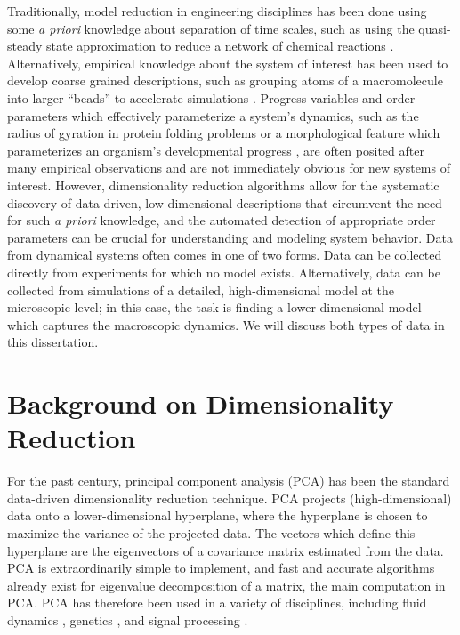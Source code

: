 Traditionally, model reduction in engineering disciplines has been done using some {\em a priori} knowledge about separation of time scales,
such as using the quasi-steady state approximation to reduce a network of chemical reactions \cite{bowen1963singular}.
%
Alternatively, empirical knowledge about the system of interest has been used to develop coarse grained descriptions, such as grouping atoms of a macromolecule into larger ``beads'' to accelerate simulations \cite{izvekov2005systematic, monticelli2008martini, saunders2013coarse, spiga2013electrostatic}.
%
Progress variables and order parameters which effectively parameterize a system's dynamics, such as the radius of gyration in protein folding problems \cite{lazaridis1997new, kim2015systematic} or a  morphological feature which parameterizes an organism's developmental progress \cite{dubuis2013accurate, hamaratoglu2011dpp}, are often posited after many empirical observations and are not immediately obvious for new systems of interest.
%
However, dimensionality reduction algorithms allow for the systematic discovery of data-driven, low-dimensional descriptions that circumvent the need for such {\em a priori} knowledge, and the automated detection of appropriate order parameters can be crucial for understanding and modeling system behavior.
%
%
Data from dynamical systems often comes in one of two forms.
%
Data can be collected directly from experiments for which no model exists.
%
Alternatively, data can be collected from simulations of a detailed, high-dimensional model at the microscopic level; in this case, the task is finding a lower-dimensional model which captures the macroscopic dynamics.
%
We will discuss both types of data in this dissertation.

\section{Background on Dimensionality Reduction} \label{sec:background}


For the past century, principal component analysis (PCA) \cite{shlens2005tutorial} has been the standard data-driven dimensionality reduction technique.
%
PCA projects (high-dimensional) data onto a lower-dimensional hyperplane, where the hyperplane is chosen to maximize the variance of the projected data.
%
The vectors which define this hyperplane are the eigenvectors of a covariance matrix estimated from the data.
%
PCA is extraordinarily simple to implement, and fast and accurate algorithms already exist for eigenvalue decomposition of a matrix, the main computation in PCA.
%
PCA has therefore been used in a variety of disciplines, including fluid dynamics \cite{rowley2004model, kunisch2002galerkin}, genetics \cite{alter2000singular, troyanskaya2001missing}, and signal processing \cite{vaseghi2008advanced}.

